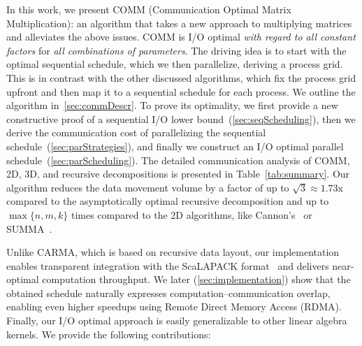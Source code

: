 \documentclass[sigplan,review,anonymous,10pt]{acmart}\settopmatter{printfolios=true,printccs=false,printacmref=false}
\newcommand\greg[1]{\textcolor{blue}{[Greg: #1]}}
\newcommand\mac[1]{\textcolor{red}{[Mac: #1]}}
\begin{document}

In this work, we present COMM (Communication Optimal Matrix Multiplication): 
an algorithm that takes a new approach to multiplying
matrices and alleviates the above issues. COMM is I/O optimal \emph{with regard 
to all constant factors}
for \emph{all combinations of parameters}. The driving idea is to start with 
the optimal sequential schedule, which we then parallelize, deriving a process 
grid. This is in contrast with the other discussed algorithms, which fix the 
process grid upfront and then map it to a sequential schedule for each 
process.   We outline the
algorithm in~\cref{sec:commDescr}.
%
To prove its optimality,  we first provide a new 
constructive proof of a sequential I/O lower bound~(\cref{sec:seqScheduling}),  
then we
derive the communication cost of  
parallelizing the sequential
schedule~(\cref{sec:parStrategies}), and finally we construct an I/O optimal 
parallel 
schedule~(\cref{sec:parScheduling}). 
The detailed communication analysis of COMM, 2D, 3D, and 
recursive decompositions is
presented in Table~\ref{tab:summary}. Our algorithm reduces the data 
movement volume by a factor of up to $\sqrt{3} \approx 1.73$x compared to 
the 
asymptotically optimal recursive decomposition and up to 
$\max\{n,m,k\}$ times compared to the 2D
algorithms, like Cannon's~\cite{generalCannon} or SUMMA~\cite{summa}.


Unlike CARMA, which is based on recursive data layout, our implementation
enables transparent integration with the ScaLAPACK
format~\cite{scalapackLayout} and delivers near-optimal computation throughput.
%
We later (\cref{sec:implementation}) show that the obtained schedule 
naturally expresses
computation--communication overlap, 
%
%
enabling even higher speedups
using Remote Direct Memory Access (RDMA).
%
%
Finally, our I/O optimal approach is
easily generalizable to other linear algebra kernels. 
%
We provide the following contributions:
\end{document}

